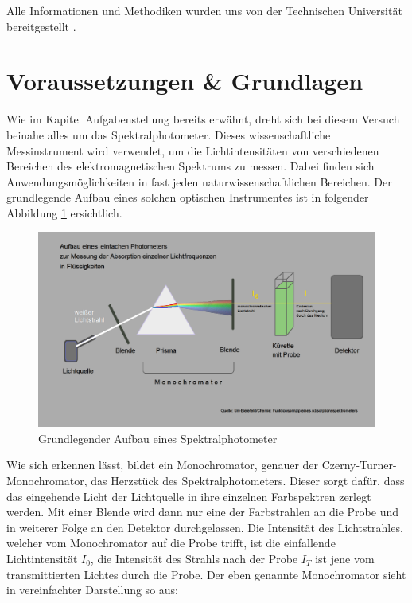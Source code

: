 \documentclass[12pt,a4paper,twoside]{article}
\begin{document}
\noindent
Alle Informationen und Methodiken wurden uns von der Technischen Universität bereitgestellt \cite{teachcenter2}. 



\section{Voraussetzungen \& Grundlagen} %

Wie im Kapitel Aufgabenstellung bereits erwähnt, dreht sich bei diesem Versuch beinahe alles um das Spektralphotometer. Dieses wissenschaftliche Messinstrument wird verwendet, um die Lichtintensitäten von verschiedenen Bereichen des elektromagnetischen Spektrums zu messen. Dabei finden sich Anwendungsmöglichkeiten in fast jeden naturwissenschaftlichen Bereichen.
Der grundlegende Aufbau eines solchen optischen Instrumentes ist in folgender Abbildung \ref{fig:SpektralphotometerAufbau} ersichtlich.

\begin{figure}[H]
    \centering
    \includegraphics[width=0.6\linewidth]{nudes/SpektralphotometerAufbauWiki.png}
    \caption{Grundlegender Aufbau eines Spektralphotometer \cite{SpektralphotometerWiki}}
    \label{fig:SpektralphotometerAufbau}
\end{figure}

\noindent
Wie sich erkennen lässt, bildet ein Monochromator, genauer der Czerny-Turner-Monochromator, das Herzstück des Spektralphotometers. Dieser sorgt dafür, dass das eingehende Licht der Lichtquelle in ihre einzelnen Farbspektren zerlegt werden. Mit einer Blende wird dann nur eine der Farbstrahlen an die Probe und in weiterer Folge an den Detektor durchgelassen. 
Die Intensität des Lichtstrahles, welcher vom Monochromator auf die Probe trifft, ist die einfallende Lichtintensität $I_{0}$, die Intensität des Strahls nach der Probe $I_{T}$ ist jene vom transmittierten Lichtes durch die Probe.
Der eben genannte Monochromator sieht in vereinfachter Darstellung so aus:
\end{document}
